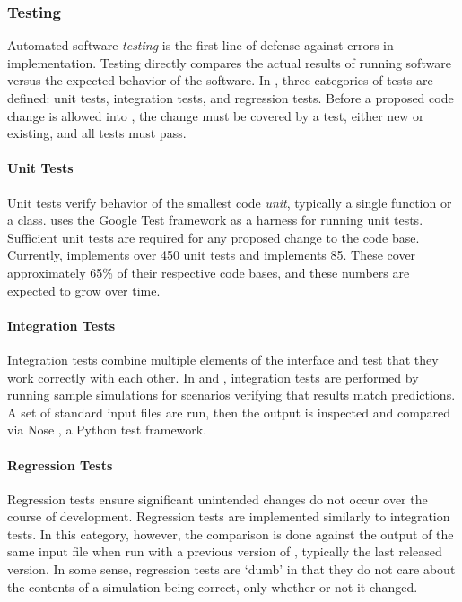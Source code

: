 \subsubsection{Testing}
\label{sec:qa-testing}

Automated software \emph{testing} is the first line of defense against
errors in implementation. Testing directly compares the
actual results of running software versus the expected behavior of the software.
In \Cyclus, three categories of tests are defined: unit tests, integration
tests, and regression tests.  Before a proposed code change is allowed into 
\Cyclus,  the change must be covered by a test, either new or existing, and all 
tests must pass.

\paragraph{Unit Tests}

Unit tests verify behavior of the smallest code \emph{unit}, typically a
single function or a class.  \Cyclus uses the Google Test framework
\cite{inc_googletest_2008} as a harness for running unit tests. Sufficient unit
tests are required for any proposed change to the \Cyclus code base. Currently,
\Cyclus implements over 450 unit tests and \Cycamore implements 85.  These
cover approximately 65\% of their respective code bases, and these numbers are
expected to grow over time.

\paragraph{Integration Tests}

Integration tests combine multiple elements of the
\Cyclus interface and test that they work correctly with each other. 
In \Cyclus and \Cycamore, integration tests are performed by running sample
simulations for scenarios verifying that results match predictions. A set of standard input
files are run, then the output is inspected and compared via Nose
\cite{pellerin_nose_2007}, a Python test framework.  

\paragraph{Regression Tests}

Regression tests ensure significant unintended changes do not
occur over the course of \Cyclus development.
Regression tests are implemented similarly to integration tests.
In this category, however, the comparison is done against
the output of the same input file when run with a previous version of \Cyclus,
typically the last released version.
In some sense, regression tests are `dumb' in that they do
not care about the contents of a simulation being correct, only whether or not
it changed.


